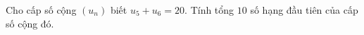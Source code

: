 \begin{ex}
Cho cấp số cộng $(u_n)$ biết $u_5+u_6=20$. Tính tổng $10$ số hạng đầu tiên của cấp số cộng đó.
\end{ex}
